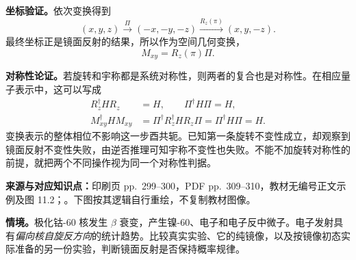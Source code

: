\begin{checkedsolution}
\textbf{坐标验证。}依次变换得到
\begin{equation}
  (x,y,z)\xrightarrow{\Pi}(-x,-y,-z)
      \xrightarrow{R_z(\pi)}(x,y,-z).
\end{equation}
最终坐标正是镜面反射的结果，所以作为空间几何变换，
\begin{equation}
  \boxed{M_{xy}=R_z(\pi)\Pi}.
\end{equation}

\textbf{对称性论证。}若旋转和宇称都是系统对称性，则两者的复合也是对称性。在相应量子表示中，这可以写成
\begin{align}
  R_z^\dagger HR_z&=H,\qquad \Pi^\dagger H\Pi=H,\\
  M_{xy}^\dagger HM_{xy}
     &=\Pi^\dagger R_z^\dagger HR_z\Pi
       =\Pi^\dagger H\Pi=H.
\end{align}
变换表示的整体相位不影响这一步酉共轭。已知第一条旋转不变性成立，却观察到镜面反射不变性失败，由逆否推理可知宇称不变性也失败。不能不加旋转对称性的前提，就把两个不同操作视为同一个对称性判据。
\end{checkedsolution}

\textbf{来源与对应知识点：}印刷页 pp.~299--300，PDF pp.~309--310，教材无编号正文示例及图 11.2；。下图按其逻辑自行重绘，不复制教材图像。

\textbf{情境。}极化钴-60 核发生 $\beta$ 衰变，产生镍-60、电子和电子反中微子。电子发射具有\emph{偏向核自旋反方向}的统计趋势。比较真实实验、它的纯镜像，以及按镜像初态实际准备的另一份实验，判断镜面反射是否保持概率规律。


